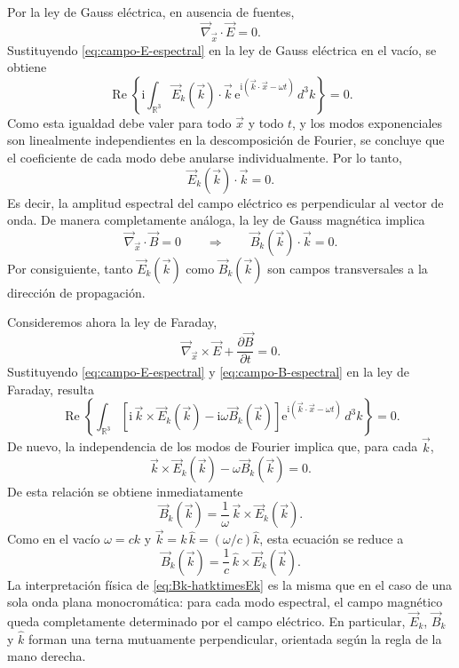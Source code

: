 \documentclass[12pt,a4paper]{article}
\theoremstyle{definition}
\theoremstyle{plain}
\numberwithin{equation}{section}
\theoremstyle{remark}
\newcommand{\ii}{\mathrm{i}}
\newcommand{\ee}{\mathrm{e}}
\begin{document}
Por la ley de Gauss eléctrica, en ausencia de fuentes,
\begin{equation*}
    \vec\nabla_{\vec x}\cdot \vec E=0.
\end{equation*}
Sustituyendo \eqref{eq:campo-E-espectral} en la ley de Gauss eléctrica en el vacío, se obtiene
\begin{equation*}
    \operatorname{Re}\left\{
        \ii\int_{\mathbb R^3}\vec E_k(\vec k)\cdot\vec k\,\ee^{\ii(\vec k\cdot\vec x-\omega t)}\,d^3k
    \right\}=0.
\end{equation*}
Como esta igualdad debe valer para todo $\vec x$ y todo $t$, y los modos exponenciales son linealmente independientes en la descomposición de Fourier, se concluye que el coeficiente de cada modo debe anularse individualmente. Por lo tanto,
\begin{equation*}
    \vec E_k(\vec k)\cdot\vec k=0.
\end{equation*}
Es decir, la amplitud espectral del campo eléctrico es perpendicular al vector de onda. De manera completamente análoga, la ley de Gauss magnética implica
\begin{equation*}
    \vec\nabla_{\vec x}\cdot \vec B=0
    \qquad\Longrightarrow\qquad
    \vec B_k(\vec k)\cdot\vec k=0.
\end{equation*}
Por consiguiente, tanto $\vec E_k(\vec k)$ como $\vec B_k(\vec k)$ son campos transversales a la dirección de propagación.

Consideremos ahora la ley de Faraday,
\begin{equation*}
    \vec\nabla_{\vec x}\times \vec E+\frac{\partial \vec B}{\partial t}=0.
\end{equation*}
Sustituyendo \eqref{eq:campo-E-espectral} y \eqref{eq:campo-B-espectral} en la ley de Faraday, resulta
\begin{equation*}
    \operatorname{Re}\left\{
        \int_{\mathbb R^3}\left[\ii\,\vec k\times\vec E_k(\vec k)-\ii\omega\vec B_k(\vec k)\right]\ee^{\ii(\vec k\cdot\vec x-\omega t)}\,d^3k
    \right\}=0.
\end{equation*}
De nuevo, la independencia de los modos de Fourier implica que, para cada $\vec k$,
\begin{equation*}
    \vec k\times\vec E_k(\vec k)-\omega\vec B_k(\vec k)=0.
\end{equation*}
De esta relación se obtiene inmediatamente
\begin{equation*}
    \vec B_k(\vec k)=\frac{1}{\omega}\,\vec k\times\vec E_k(\vec k).
\end{equation*}
Como en el vacío $\omega=ck$ y $\vec k=k\,\hat k=(\omega/c)\hat k$, esta ecuación se reduce a
\begin{equation}
    \vec B_k(\vec k)=\frac{1}{c}\,\hat k\times \vec E_k(\vec k).
    \label{eq:Bk-hatktimesEk}
\end{equation}
La interpretación física de \eqref{eq:Bk-hatktimesEk} es la misma que en el caso de una sola onda plana monocromática: para cada modo espectral, el campo magnético queda completamente determinado por el campo eléctrico. En particular, $\vec E_k$, $\vec B_k$ y $\hat k$ forman una terna mutuamente perpendicular, orientada según la regla de la mano derecha.
\end{document}
